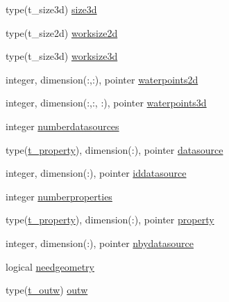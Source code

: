 \begin{DoxyCompactItemize}
type(t\+\_\+size3d) \mbox{\hyperlink{structmoduleinterpolatetime_1_1t__interpolatetime_ad91438bb8465f515c5bf9e3a8aa94828}{size3d}}
\item 
type(t\+\_\+size2d) \mbox{\hyperlink{structmoduleinterpolatetime_1_1t__interpolatetime_a2a3a49544573629e88ad35a4e7b6d62a}{worksize2d}}
\item 
type(t\+\_\+size3d) \mbox{\hyperlink{structmoduleinterpolatetime_1_1t__interpolatetime_a2c1b86e7ae305e09f8d037c42a983315}{worksize3d}}
\item 
integer, dimension(\+:,\+:), pointer \mbox{\hyperlink{structmoduleinterpolatetime_1_1t__interpolatetime_a805c7bce0f3bcadb57129e6a40dbcf31}{waterpoints2d}}
\item 
integer, dimension(\+:,\+:, \+:), pointer \mbox{\hyperlink{structmoduleinterpolatetime_1_1t__interpolatetime_af3ca9422e70c0941cf7710d4d177d644}{waterpoints3d}}
\item 
integer \mbox{\hyperlink{structmoduleinterpolatetime_1_1t__interpolatetime_a4f3cf7098db737c7422ab119990bcd33}{numberdatasources}}
\item 
type(\mbox{\hyperlink{structmoduleinterpolatetime_1_1t__property}{t\+\_\+property}}), dimension(\+:), pointer \mbox{\hyperlink{structmoduleinterpolatetime_1_1t__interpolatetime_ad059848acb1fec8a016213ca9562e0f4}{datasource}}
\item 
integer, dimension(\+:), pointer \mbox{\hyperlink{structmoduleinterpolatetime_1_1t__interpolatetime_ac1a2cac715622d48fed780a3a5112afe}{iddatasource}}
\item 
integer \mbox{\hyperlink{structmoduleinterpolatetime_1_1t__interpolatetime_ae05bd63ac9d45c42185051504080290f}{numberproperties}}
\item 
type(\mbox{\hyperlink{structmoduleinterpolatetime_1_1t__property}{t\+\_\+property}}), dimension(\+:), pointer \mbox{\hyperlink{structmoduleinterpolatetime_1_1t__interpolatetime_a2a25a95614be907821b53be1cef26bb0}{property}}
\item 
integer, dimension(\+:), pointer \mbox{\hyperlink{structmoduleinterpolatetime_1_1t__interpolatetime_ab3b643adbb2b5d88b8b3ecfc410b2e60}{nbydatasource}}
\item 
logical \mbox{\hyperlink{structmoduleinterpolatetime_1_1t__interpolatetime_aa82d3405f540ae5bd0cfd9d564fc9967}{needgeometry}}
\item 
type(\mbox{\hyperlink{structmoduleinterpolatetime_1_1t__outw}{t\+\_\+outw}}) \mbox{\hyperlink{structmoduleinterpolatetime_1_1t__interpolatetime_a68c015dcb99d82cf69ec4b3f610a7519}{outw}}
\end{DoxyCompactItemize}


